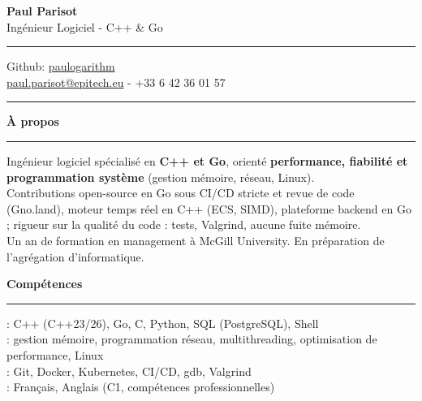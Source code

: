 \documentclass[9pt]{extarticle}
\begin{document}
\begin{center}
	{\huge\bfseries Paul Parisot}
	\\[4pt]
	{\Large Ingénieur Logiciel - C++ \& Go}
	\\
\end{center}

\par\vspace{-5pt}
\rule{\linewidth}{0.4pt}
\par\vspace{-5pt}

\begin{center}
	Github: \href{https://github.com/paulogarithm}{paulogarithm}
	\\
	\href{mailto:paul.parisot@epitech.eu}{paul.parisot@epitech.eu} - +33 6 42 36 01 57
	\\
\end{center}

\par\vspace{-10pt}
\rule{\linewidth}{0.4pt}
\par\vspace{7pt}

{\large\bfseries À propos}
\par\vspace{-8pt}
\rule{\linewidth}{0.4pt}
\par\vspace{5pt}

Ingénieur logiciel spécialisé en {\bfseries C++ et Go}, orienté {\bfseries performance, fiabilité et programmation système} (gestion mémoire, réseau, Linux).
\\
Contributions open-source en Go sous CI/CD stricte et revue de code (Gno.land), moteur temps réel en C++ (ECS, SIMD), plateforme backend en Go ; rigueur sur la qualité du code : tests, Valgrind, aucune fuite mémoire.
\\
Un an de formation en management à McGill University. En préparation de l'agrégation d'informatique.
\par\vspace{5pt}

{\large\bfseries Compétences}
\par\vspace{-8pt}
\rule{\linewidth}{0.4pt}
\par\vspace{5pt}

\hspace*{5pt}{\bfseries Maîtrise}: C++ (C++23/26), Go, C, Python, SQL (PostgreSQL), Shell
\\
\hspace*{5pt}{\bfseries Systèmes}: gestion mémoire, programmation réseau, multithreading, optimisation de performance, Linux
\\
\hspace*{5pt}{\bfseries Outils}: Git, Docker, Kubernetes, CI/CD, gdb, Valgrind
\\
\hspace*{5pt}{\bfseries Langues}: Français, Anglais (C1, compétences professionnelles)
\end{document}
